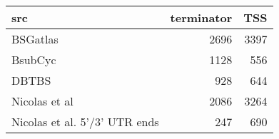 \centering
\begin{tabular}{lrr}
\toprule
src & terminator & TSS\\
\midrule
BSGatlas & 2696 & 3397\\
BsubCyc & 1128 & 556\\
DBTBS & 928 & 644\\
Nicolas et al & 2086 & 3264\\
Nicolas et al. 5'/3' UTR ends & 247 & 690\\
\bottomrule
\end{tabular}
